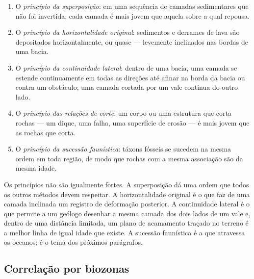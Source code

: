 \begin{definition}\label{def:b1:stratigraphic-scale:principles}
\begin{enumerate}
  \item O \emph{princípio da superposição}: em uma sequência
        de camadas sedimentares que não foi invertida, cada camada é mais jovem que aquela
        sobre a qual repousa.
  \item O \emph{princípio da horizontalidade original}: sedimentos e derrames de lava são depositados horizontalmente, ou quase ---
        levemente inclinados nas bordas de uma bacia.
  \item O \emph{princípio da continuidade lateral}:
        dentro de uma bacia, uma camada se estende continuamente em todas as direções até
        afinar na borda da bacia ou contra um obstáculo; uma camada cortada por um vale
        continua do outro lado.
  \item O \emph{princípio das relações de corte}: um
        corpo ou uma estrutura que corta rochas --- um dique, uma falha, uma superfície de
        erosão --- é mais jovem que as rochas que corta.
  \item O \emph{princípio da sucessão faunística}:
        táxons fósseis se sucedem na mesma ordem em toda região, de modo que rochas com a
        mesma associação são da mesma idade.
\end{enumerate}
\end{definition}

Os princípios não são igualmente fortes. A superposição dá uma ordem que todos os outros
métodos devem respeitar. A horizontalidade original é o que faz de uma camada inclinada um
registro de deformação posterior. A continuidade lateral é o que permite a um geólogo
desenhar a mesma camada dos dois lados de um vale e, dentro de uma distância limitada, um
plano de acamamento traçado no terreno é a melhor linha de igual idade que existe. A sucessão
faunística é a que atravessa os oceanos; é o tema dos próximos parágrafos.

\subsection*{Correlação por biozonas}

